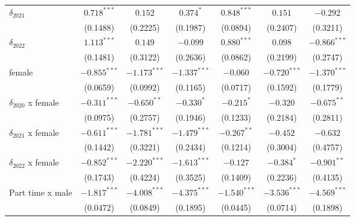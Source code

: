 \begin{tabular}{l|ccc|ccc}
$\delta_{2021}$                        &   $0.718^{***}$ &         $0.152$ &       $0.374^*$ &          $0.848^{***}$ &         $0.151$ &        $-0.292$ \\
                                       &        (0.1488) &        (0.2225) &        (0.1987) &               (0.0894) &        (0.2407) &        (0.3211) \\
$\delta_{2022}$                        &   $1.113^{***}$ &         $0.149$ &        $-0.099$ &          $0.880^{***}$ &         $0.098$ &  $-0.866^{***}$ \\
                                       &        (0.1481) &        (0.3122) &        (0.2636) &               (0.0862) &        (0.2199) &        (0.2747) \\
female                                 &  $-0.855^{***}$ &  $-1.173^{***}$ &  $-1.337^{***}$ &               $-0.060$ &  $-0.720^{***}$ &  $-1.370^{***}$ \\
                                       &        (0.0659) &        (0.0992) &        (0.1165) &               (0.0717) &        (0.1592) &        (0.1779) \\
$\delta_{2020}$ x female               &  $-0.311^{***}$ &   $-0.650^{**}$ &      $-0.330^*$ &             $-0.215^*$ &        $-0.320$ &   $-0.675^{**}$ \\
                                       &        (0.0975) &        (0.2757) &        (0.1946) &               (0.1233) &        (0.2184) &        (0.2811) \\
$\delta_{2021}$ x female               &  $-0.611^{***}$ &  $-1.781^{***}$ &  $-1.479^{***}$ &          $-0.267^{**}$ &        $-0.452$ &        $-0.632$ \\
                                       &        (0.1442) &        (0.3221) &        (0.2434) &               (0.1214) &        (0.3004) &        (0.4757) \\
$\delta_{2022}$ x female               &  $-0.852^{***}$ &  $-2.220^{***}$ &  $-1.613^{***}$ &               $-0.127$ &      $-0.384^*$ &   $-0.901^{**}$ \\
                                       &        (0.1743) &        (0.4224) &        (0.3525) &               (0.1409) &        (0.2236) &        (0.4135) \\
Part time x male                       &  $-1.817^{***}$ &  $-4.008^{***}$ &  $-4.375^{***}$ &         $-1.540^{***}$ &  $-3.536^{***}$ &  $-4.569^{***}$ \\
                                       &        (0.0472) &        (0.0849) &        (0.1895) &               (0.0445) &        (0.0714) &        (0.1898) \\

\end{tabular}
